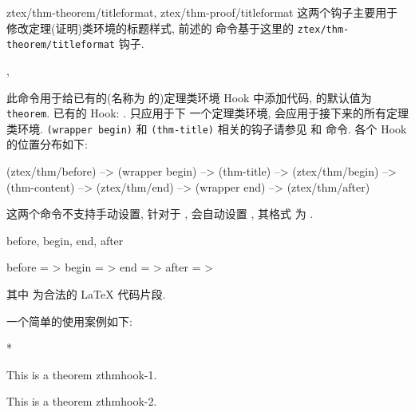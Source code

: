 \begin{function}[added=2025-05-05]{ztex/thm-theorem/titleformat, ztex/thm-proof/titleformat}
  这两个钩子主要用于修改定理(证明)类环境的标题样式, 前述的 \cmd{\zthmtitleformat} 命令基于这里的
  \texttt{ztex/thm-theorem/titleformat} 钩子.
\end{function}


\begin{function}[updated=2025-04-25]{\zthmhook, \zthmhook*}
  \begin{syntax}
  \end{syntax}
  此命令用于给已有的(名称为  的)定理类环境 Hook 中添加代码,  的默认值为 \texttt{theorem}. 
  已有的 Hook: .  只应用于下
  一个定理类环境,  会应用于接下来的所有定理类环境. \texttt{(wrapper begin)} 和 \texttt{(thm-title)}
  相关的钩子请参见  和  命令.  各个 Hook 的位置分布如下:
\end{function}
\def\exampleUR{}
\begin{DocExample}[@@]
(ztex/thm/before) --> (wrapper begin) --> (thm-title) 
  --> (ztex/thm/begin) --> 
      (thm-content) 
  --> (ztex/thm/end) --> 
(wrapper end) --> (ztex/thm/after)
\end{DocExample}
\resetExampleUR

这两个命令不支持手动设置, 针对于 \cmd{\zthmhook*}, \ztex{} 会自动设置 , 其格式
为 . 


\begin{keyval}[parent=..]{before, begin, end, after}
  \begin{syntax}
    before = >
    begin  = >
    end    = >
    after  = >
  \end{syntax}
  其中  为合法的 \LaTeX{} 代码片段.
\end{keyval}
一个简单的使用案例如下:
\begin{DocExample}*
\begin{theorem}[zthmhook-1]
  This is a theorem zthmhook-1.
\end{theorem}
\begin{theorem}[zthmhook-2]
  This is a theorem zthmhook-2.
\end{theorem}
\end{DocExample}


